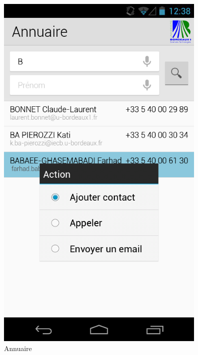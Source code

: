 \documentclass [pdftex,12pt] {report}
\begin{document}
\begin{figure}
\begin{minipage}[t]{8cm}
    \includegraphics[width=0.9\textwidth]{resources/ui_preview/06}
    \caption{Annuaire}
    \label{fig:06}
  \end{minipage}
\end{figure}
\end{document}
